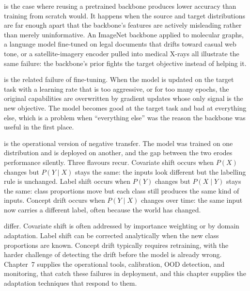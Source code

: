  is the case where reusing a pretrained backbone produces lower accuracy than training from scratch would. It happens when the source and target distributions are far enough apart that the backbone's features are actively misleading rather than merely uninformative. An ImageNet backbone applied to molecular graphs, a language model fine-tuned on legal documents that drifts toward casual web tone, or a satellite-imagery encoder pulled into medical X-rays all illustrate the same failure: the backbone's prior fights the target objective instead of helping it.

 is the related failure of fine-tuning. When the model is updated on the target task with a learning rate that is too aggressive, or for too many epochs, the original capabilities are overwritten by gradient updates whose only signal is the new objective. The model becomes good at the target task and bad at everything else, which is a problem when ``everything else'' was the reason the backbone was useful in the first place.

 is the operational version of negative transfer. The model was trained on one distribution and is deployed on another, and the gap between the two erodes performance silently. Three flavours recur. Covariate shift occurs when $P(X)$ changes but $P(Y \mid X)$ stays the same: the inputs look different but the labelling rule is unchanged. Label shift occurs when $P(Y)$ changes but $P(X \mid Y)$ stays the same: class proportions move but each class still produces the same kind of inputs. Concept drift occurs when $P(Y \mid X)$ changes over time: the same input now carries a different label, often because the world has changed.


 differ. Covariate shift is often addressed by importance weighting or by domain adaptation. Label shift can be corrected analytically when the new class proportions are known. Concept drift typically requires retraining, with the harder challenge of detecting the drift before the model is already wrong. Chapter~7 supplies the operational tools, calibration, OOD detection, and monitoring, that catch these failures in deployment, and this chapter supplies the adaptation techniques that respond to them.

